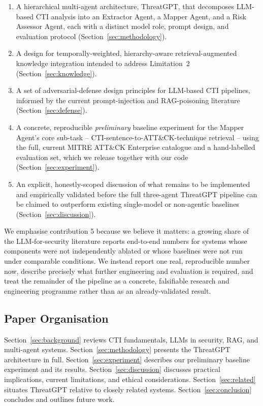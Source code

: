 \documentclass[runningheads]{llncs}
\begin{document}
\begin{enumerate}
    \item A hierarchical multi-agent architecture, ThreatGPT, that decomposes LLM-based CTI analysis into an Extractor Agent, a Mapper Agent, and a Risk Assessor Agent, each with a distinct model role, prompt design, and evaluation protocol (Section~\ref{sec:methodology}).
    \item A design for temporally-weighted, hierarchy-aware retrieval-augmented knowledge integration intended to address Limitation~2 (Section~\ref{sec:knowledge}).
    \item A set of adversarial-defense design principles for LLM-based CTI pipelines, informed by the current prompt-injection and RAG-poisoning literature (Section~\ref{sec:defense}).
    \item A concrete, reproducible \emph{preliminary} baseline experiment for the Mapper Agent's core sub-task -- CTI-sentence-to-ATT\&CK-technique retrieval -- using the full, current MITRE ATT\&CK Enterprise catalogue and a hand-labelled evaluation set, which we release together with our code (Section~\ref{sec:experiment}).
    \item An explicit, honestly-scoped discussion of what remains to be implemented and empirically validated before the full three-agent ThreatGPT pipeline can be claimed to outperform existing single-model or non-agentic baselines (Section~\ref{sec:discussion}).
\end{enumerate}

We emphasise contribution 5 because we believe it matters: a growing share of the LLM-for-security literature reports end-to-end numbers for systems whose components were not independently ablated or whose baselines were not run under comparable conditions. We instead report one real, reproducible number now, describe precisely what further engineering and evaluation is required, and treat the remainder of the pipeline as a concrete, falsifiable research and engineering programme rather than as an already-validated result.

\subsection{Paper Organisation}

Section~\ref{sec:background} reviews CTI fundamentals, LLMs in security, RAG, and multi-agent systems. Section~\ref{sec:methodology} presents the ThreatGPT architecture in full. Section~\ref{sec:experiment} describes our preliminary baseline experiment and its results. Section~\ref{sec:discussion} discusses practical implications, current limitations, and ethical considerations. Section~\ref{sec:related} situates ThreatGPT relative to closely related systems. Section~\ref{sec:conclusion} concludes and outlines future work.
\end{document}
